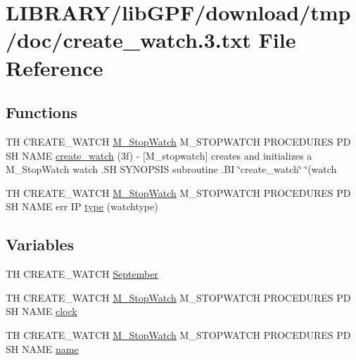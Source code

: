 \hypertarget{create__watch_83_8txt}{}\section{L\+I\+B\+R\+A\+R\+Y/lib\+G\+P\+F/download/tmp/doc/create\+\_\+watch.3.txt File Reference}
\label{create__watch_83_8txt}
\subsection*{Functions}
\begin{DoxyCompactItemize}
\item 
TH C\+R\+E\+A\+T\+E\+\_\+\+W\+A\+T\+CH \hyperlink{option__stopwatch_83_8txt_aa2011fc45a5e502e87ee50996a8a9305}{M\+\_\+\+Stop\+Watch} M\+\_\+\+S\+T\+O\+P\+W\+A\+T\+CH P\+R\+O\+C\+E\+D\+U\+R\+ES PD SH N\+A\+ME \hyperlink{create__watch_83_8txt_a6deb35ddebb447c9dceca30690d1581d}{create\+\_\+watch} (3f) -\/ \mbox{[}\+M\+\_\+stopwatch\mbox{]} creates and initializes a M\+\_\+\+Stop\+Watch watch .\+S\+H S\+Y\+N\+O\+P\+S\+I\+S subroutine .\+B\+I \char`\"{}create\+\_\+watch\char`\"{} \char`\"{}(watch
\item 
TH C\+R\+E\+A\+T\+E\+\_\+\+W\+A\+T\+CH \hyperlink{option__stopwatch_83_8txt_aa2011fc45a5e502e87ee50996a8a9305}{M\+\_\+\+Stop\+Watch} M\+\_\+\+S\+T\+O\+P\+W\+A\+T\+CH P\+R\+O\+C\+E\+D\+U\+R\+ES PD SH N\+A\+ME err IP \hyperlink{create__watch_83_8txt_a6036c8b9d18bd95ef0feb888982faa0b}{type} (watchtype)
\end{DoxyCompactItemize}
\subsection*{Variables}
\begin{DoxyCompactItemize}
\item 
TH C\+R\+E\+A\+T\+E\+\_\+\+W\+A\+T\+CH \hyperlink{create__watch_83_8txt_a3f52c4f0a971d6aad8d5872fab85fac6}{September}
\item 
TH C\+R\+E\+A\+T\+E\+\_\+\+W\+A\+T\+CH \hyperlink{option__stopwatch_83_8txt_aa2011fc45a5e502e87ee50996a8a9305}{M\+\_\+\+Stop\+Watch} M\+\_\+\+S\+T\+O\+P\+W\+A\+T\+CH P\+R\+O\+C\+E\+D\+U\+R\+ES PD SH N\+A\+ME \hyperlink{create__watch_83_8txt_ae5a722940632dbef0e5f6b03622fbf1c}{clock}
\item 
TH C\+R\+E\+A\+T\+E\+\_\+\+W\+A\+T\+CH \hyperlink{option__stopwatch_83_8txt_aa2011fc45a5e502e87ee50996a8a9305}{M\+\_\+\+Stop\+Watch} M\+\_\+\+S\+T\+O\+P\+W\+A\+T\+CH P\+R\+O\+C\+E\+D\+U\+R\+ES PD SH N\+A\+ME \hyperlink{create__watch_83_8txt_a7952910b2b90c60662fb5b4a4e85427c}{name}
\end{DoxyCompactItemize}


